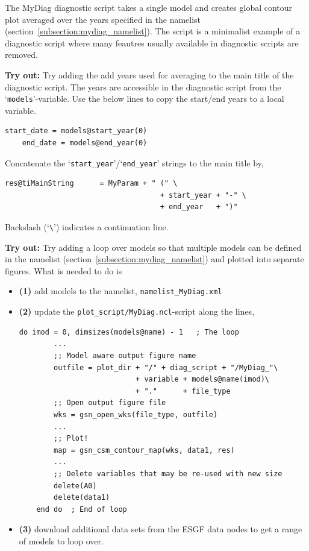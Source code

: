 \documentclass[12pt]{article}
\begin{document}
The MyDiag diagnostic script takes a single model and creates global
contour plot averaged over the years specified in the namelist
(section~\ref{subsection:mydiag_namelist}). The script is a minimalist
example of a diagnostic script where many feautres usually available in
diagnostic scripts are removed.

\textbf{Try out:} Try adding the add years used for averaging to the
main title of the diagnostic script. The years are accessible in the
diagnostic script from the `\texttt{models}'-variable. Use the below
lines to copy the start/end years to a local variable.
\begin{Verbatim}[frame=single, fontsize=\footnotesize]
    start_date = models@start_year(0)
    end_date = models@end_year(0)
\end{Verbatim}
Concatenate the `\texttt{start\_year}'/`\texttt{end\_year}' strings to the
main title by,
\begin{Verbatim}[frame=single, fontsize=\footnotesize]
    res@tiMainString      = MyParam + " (" \
                                    + start_year + "-" \
                                    + end_year   + ")"
\end{Verbatim}
Backslash (`\texttt{\textbackslash}') indicates a continuation line.

\textbf{Try out:} Try adding a loop over models so that multiple
models can be defined in the namelist
(section~\ref{subsection:mydiag_namelist}) and plotted into separate
figures. What is needed to do is
\begin{itemize}
\item{\textbf{(1)}} add models to the namelist, \texttt{namelist\_MyDiag.xml}
\item{\textbf{(2)}} update the \texttt{plot\_script/MyDiag.ncl}-script along
the lines,
\begin{Verbatim}[frame=single, fontsize=\footnotesize]
    do imod = 0, dimsizes(models@name) - 1   ; The loop
        ...
        ;; Model aware output figure name
        outfile = plot_dir + "/" + diag_script + "/MyDiag_"\
                           + variable + models@name(imod)\
                           + "."      + file_type
        ;; Open output figure file
        wks = gsn_open_wks(file_type, outfile)
        ...
        ;; Plot!
        map = gsn_csm_contour_map(wks, data1, res)
        ...
        ;; Delete variables that may be re-used with new size
        delete(A0)
        delete(data1)
    end do  ; End of loop
\end{Verbatim}
\item{\textbf{(3)}} download additional data sets from the ESGF data
nodes\cite{esgf} to get a range of models to loop over.
\end{itemize}
\end{document}
